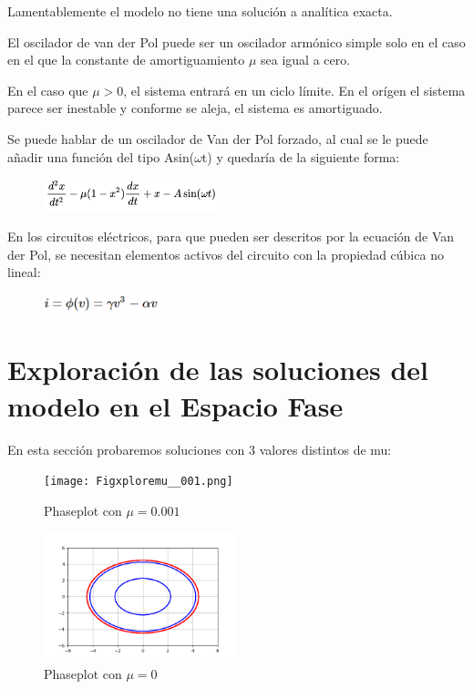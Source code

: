 \documentclass[a4paper]{article}
\begin{document}
\noindent
Lamentablemente el modelo no tiene una solución a analítica exacta. 

El oscilador de van der Pol puede ser un oscilador armónico simple solo en el caso en el que la constante de amortiguamiento $\mu$ sea igual a cero.

En el caso que $\mu>0$, el sistema entrará en un ciclo límite. En el orígen el sistema parece ser inestable y conforme se aleja, el sistema es amortiguado.

Se puede hablar de un oscilador de Van der Pol forzado, al cual  se le puede añadir una función del tipo Asin($\omega$t) y quedaría de la siguiente forma:


\begin{figure}[ht!]
\centering
\includegraphics[width=0.45\textwidth]{Eq_dif3.PNG}
\end{figure}

En los circuitos eléctricos, para que pueden ser descritos por la ecuación de Van der Pol, se necesitan elementos activos del circuito con la propiedad cúbica no lineal:

\begin{figure}[ht!]
\centering
\includegraphics[width=0.3\textwidth]{Eq_dif5.PNG}
\end{figure}





\newpage

\section {Exploración de las soluciones del modelo en el Espacio Fase}

En esta sección probaremos soluciones con 3 valores distintos de mu:


\begin{figure}[ht!]
\centering
\centering
\texttt{[image: Figxploremu\_\_001.png]}
\caption{Phaseplot con $\mu=0.001$}
\end{figure}

\begin{figure}[ht!]
\centering
\centering
\includegraphics[width = 0.5\textwidth]{Figxploremu_0.png}
\caption{Phaseplot con $\mu=0$}
\end{figure}
\end{document}
